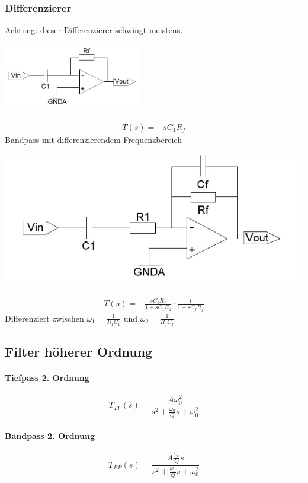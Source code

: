 \subsubsection{Differenzierer}
\begin{multicols}{2}


	Achtung: dieser Differenzierer schwingt meistens.
	\begin{center}
		\includegraphics[width=6cm]{images/filter_1_diff.jpg}
	\end{center}
	\begin{align*}
		T(s) = -s C_1 R_f
	\end{align*}
\vfill	
\columnbreak
	Bandpass mit differenzierendem Frequenzbereich
	\begin{center}
		\includegraphics[width=0.7\linewidth]{images/filter_1_diff2.jpg}
	\end{center}
	\begin{align*}
		T(s) = - \frac{s C_1 R_f}{1 + s C_1 R_1} \cdot \frac{1}{1 + s C_f R_f}
	\end{align*}
	Differenziert zwischen $\omega_1 = \frac{1}{R_1 C_1}$ und 
	$\omega_2 = \frac{1}{R_f C_f}$

\end{multicols}

\subsection{Filter höherer Ordnung}

\begin{multicols}{2}
	\paragraph{Tiefpass 2. Ordnung}
	\begin{equation*}
		T_{TP}(s) = \frac{A \omega_0^2}{s^2 + \frac{\omega_0}{Q} s + \omega_0^2}
	\end{equation*}
	
	\paragraph{Bandpass 2. Ordnung}
	\begin{equation*}
		T_{BP}(s) = \frac{A \frac{\omega_0}{Q} s}{s^2 + \frac{\omega_0}{Q} s + \omega_0^2}
	\end{equation*}
\end{multicols}


